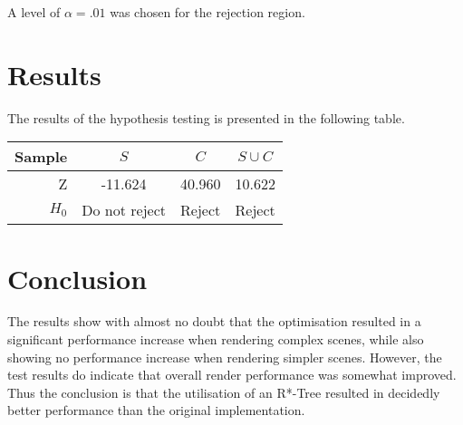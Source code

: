 \documentclass[a4paper]{article}
\begin{document}
A level of $\alpha = .01$ was chosen for the rejection region.

\section{Results}

The results of the hypothesis testing is presented in the following table.

\begin{center}
  \begin{tabular}{ | r || c | c | c | }
    \hline
    Sample  & $S$           & $C$    & $S \cup C$ \\ \hline \hline
    Z       & -11.624       & 40.960 & 10.622     \\ \hline
    $H_0$   & Do not reject & Reject & Reject     \\
    \hline
  \end{tabular}
\end{center}

\section{Conclusion}

The results show with almost no doubt that the optimisation resulted in a significant performance increase when rendering complex scenes, while also showing no performance increase when rendering simpler scenes. However, the test results do indicate that overall render performance was somewhat improved. Thus the conclusion is that the utilisation of an R*-Tree resulted in decidedly better performance than the original implementation.
\end{document}
